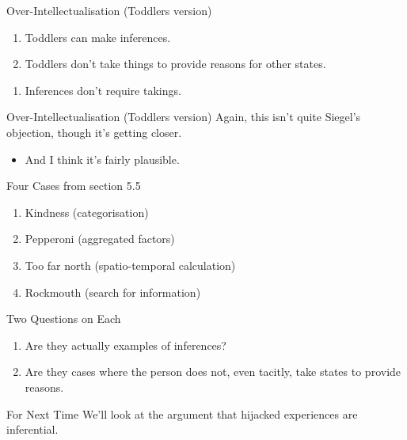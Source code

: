 \documentclass[
  17pt,
  letterpaper,
  ignorenonframetext,
  aspectratio=169,
  handout,
  xcolor={dvipsnames}]{beamer}
\providecommand{\tightlist}{%
  \setlength{\itemsep}{0pt}\setlength{\parskip}{0pt}}\usepackage{longtable,booktabs,array}
\begin{document}
\begin{frame}{Over-Intellectualisation (Toddlers version)}
\protect\hypertarget{over-intellectualisation-toddlers-version}{}
\begin{enumerate}[<+->]
\tightlist
\item
  Toddlers can make inferences.
\item
  Toddlers don't take things to provide reasons for other states.
\end{enumerate}

\begin{enumerate}[<+->]
[A.]
\setcounter{enumi}{2}
\tightlist
\item
  Inferences don't require takings.
\end{enumerate}
\end{frame}

\begin{frame}{Over-Intellectualisation (Toddlers version)}
\protect\hypertarget{over-intellectualisation-toddlers-version-1}{}
Again, this isn't quite Siegel's objection, though it's getting closer.

\begin{itemize}[<+->]
\tightlist
\item
  And I think it's fairly plausible.
\end{itemize}
\end{frame}

\begin{frame}{Four Cases from section 5.5}
\protect\hypertarget{four-cases-from-section-5.5}{}
\begin{enumerate}[<+->]
\tightlist
\item
  Kindness (categorisation)
\item
  Pepperoni (aggregated factors)
\item
  Too far north (spatio-temporal calculation)
\item
  Rockmouth (search for information)
\end{enumerate}
\end{frame}

\begin{frame}{Two Questions on Each}
\protect\hypertarget{two-questions-on-each}{}
\begin{enumerate}[<+->]
\tightlist
\item
  Are they actually examples of inferences?
\item
  Are they cases where the person does not, even tacitly, take states to
  provide reasons.
\end{enumerate}
\end{frame}

\begin{frame}{For Next Time}
\protect\hypertarget{for-next-time}{}
We'll look at the argument that hijacked experiences are inferential.
\end{frame}
\end{document}
